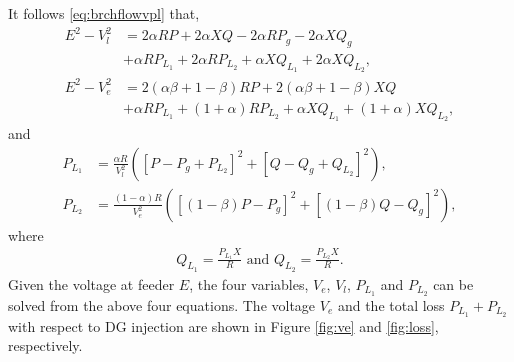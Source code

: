 \documentclass{article}
\begin{document}
It follows \eqref{eq:brchflowvpl} that,
\begin{align*}
E^2-V_l^2  &=2\alpha RP+2\alpha X Q-2\alpha RP_g-2\alpha X Q_g \\
&+\alpha RP_{L_1}+2\alpha RP_{L_2}+\alpha X Q_{L_1}+2\alpha XQ_{L_2},\\
E^2-V_e^2&=2(\alpha\beta+1-\beta)RP+2(\alpha\beta+1-\beta)X Q \\
&+
\alpha RP_{L_1}+(1+\alpha) RP_{L_2}+\alpha X Q_{L_1}+(1+\alpha) XQ_{L_2},
\end{align*}
and
\begin{align*}
P_{L_1} &=\frac{\alpha R}{V_l^2}\left(\left[P-P_{g}+P_{L_2}\right]^2+\left[Q-Q_{g}+Q_{L_2}\right]^2 \right), \\
P_{L_2} &= \frac{(1-\alpha)R}{V_e^2}\left(\left[(1-\beta)P-P_{g}\right]^2+\left[(1-\beta)Q-Q_{g}\right]^2 \right),
\end{align*}
where
\begin{align*}
Q_{L_1}=\frac{P_{L_1}X}{R} \text{ and } Q_{L_2}=\frac{P_{L_2}X}{R}.
\end{align*}
Given the voltage at feeder $E$, the four variables, $V_e$, $V_l$, $P_{L_1}$ and $P_{L_2}$ can be solved from the above four equations. The voltage $V_e$ and the total loss $P_{L_1}+P_{L_2}$ with respect to DG injection are shown in Figure \ref{fig:ve} and \ref{fig:loss}, respectively.
\end{document}
